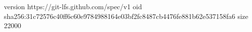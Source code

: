 version https://git-lfs.github.com/spec/v1
oid sha256:31c72576c40ff6c60e9784988164e03bf2fc8487cb4476fe881b62e537158fa6
size 22000
